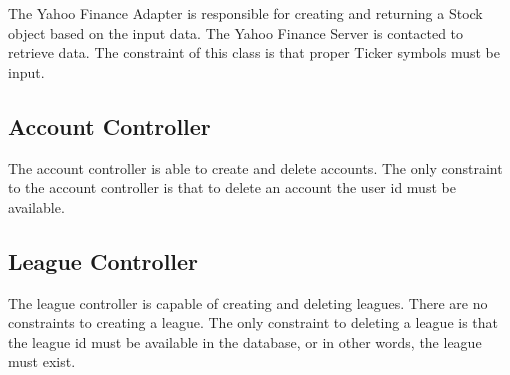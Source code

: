 The Yahoo Finance Adapter is responsible for creating and returning a Stock
object based on the input data. The Yahoo Finance Server is contacted to
retrieve data. The constraint of this class is that proper Ticker symbols must
be input.

\subsection{Account Controller}
The account controller is able to create and delete accounts. The only
constraint to the account controller is that to delete an account the user id
must be available.

\subsection{League Controller}
The league controller is capable of creating and deleting leagues. There are no
constraints to creating a league. The only constraint to deleting a league is
that the league id must be available in the database, or in other words, the
league must exist.


